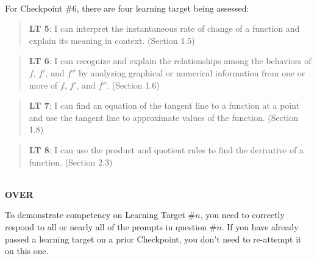 \documentclass[11 pt]{article}
\begin{document}
\noindent \hrulefill \\

 For Checkpoint \#6, there are four learning target being assessed: 

\begin{quote}
{\bf LT 5}:  I can interpret the instantaneous rate of change of a function and explain its meaning in context.  (Section 1.5)
\end{quote}

\begin{quote}
{\bf LT 6}: I can recognize and explain the relationships among the behaviors of $f$, $f'$, and $f''$ by analyzing graphical or numerical information from one or more of $f$, $f'$, and $f''$. (Section 1.6)
\end{quote}

\begin{quote}
{\bf LT 7}: I can find an equation of the tangent line to a function at a point and use the tangent line to approximate values of the function. (Section 1.8)
\end{quote}

\begin{quote}
{\bf LT 8}:  I can use the product and quotient rules to find the derivative of a function. (Section 2.3)
\end{quote}


\noindent \hrulefill \\

\vfill \hfill {\bf OVER} 

\pagebreak


\noindent To demonstrate competency on Learning Target \#$n$, you need to correctly respond to all or nearly all of the prompts in question \#$n$.  If you have already passed a learning target on a prior Checkpoint, you don't need to re-attempt it on this one.
  
\end{document}
